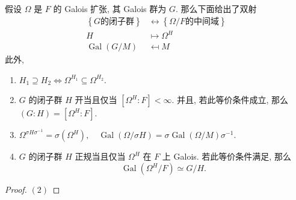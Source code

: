 \begin{theorem}
  假设 \( \Omega \) 是 \( F \) 的 Galois 扩张, 其 Galois 群为 \( G \).
  那么下面给出了双射
  \[
    \begin{split}
      \left\lbrace G \text{的闭子群} \right\rbrace &\leftrightarrow \left\lbrace
      \Omega/F \text{的中间域} \right\rbrace\\ H & \mapsto \Omega^H\\
      \operatorname{Gal}(G/M) &\mapsfrom M
    \end{split}
  \]
  此外,
  \begin{enumerate}
    \item \( H_1 \supseteq H_2 \iff \Omega^{H_1} \subseteq \Omega^{H_2} \).
    \item \( G \) 的闭子群 \( H \) 开当且仅当 \( [\Omega^H: F] < \infty \).
      并且, 若此等价条件成立, 那么 \( (G: H) = [\Omega^H: F] \).
    \item \( \Omega^{\sigma H \sigma^{-1}} = \sigma(\Omega^H),\quad
      \operatorname{Gal}(\Omega/\sigma H) = \sigma
      \operatorname{Gal}(\Omega/M)\sigma^{-1} \).
    \item \( G \) 的闭子群 \( H \) 正规当且仅当 \( \Omega^H \) 在 \( F \)
      上 Galois.
      若此等价条件满足, 那么
      \[
        \operatorname{Gal}(\Omega^H / F) \simeq G / H.
      \]
  \end{enumerate}
\end{theorem}
\begin{proof}
  \( (2) \)
\end{proof}
